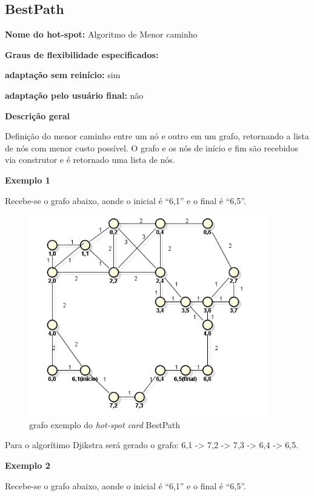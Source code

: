 \begin{anexosenv}
\section{BestPath}

{\large \textbf{Nome do hot-spot:}} Algoritmo de Menor caminho

{\large \textbf{Graus de flexibilidade especificados:}}

\textbf{adaptação sem reinício:} sim

\textbf{adaptação pelo usuário final:} não

{\large \textbf{Descrição geral}}

Definição do menor caminho entre um nó e outro em um grafo, retornando a lista de nós com menor custo possível. O grafo e os nós de início e fim são recebidos via construtor e é retornado uma lista de nós.

{\large \textbf{Exemplo 1}}

Recebe-se o grafo abaixo, aonde o inicial é “6,1” e o final é “6,5”.

\begin{figure}[H]
	\centering
	\label{figXX}
		\includegraphics[keepaspectratio=true,scale=0.7]{figuras/grafohotspotcard1.PNG}
	\caption{grafo exemplo do \textit{hot-spot card} BestPath}
\end{figure}

Para o algorítimo Djikstra será gerado o grafo: 6,1 -> 7,2 -> 7,3 -> 6,4 -> 6,5.

{\large \textbf{Exemplo 2}}

Recebe-se o grafo abaixo, aonde o inicial é “6,1” e o final é “6,5”.


\end{anexosenv}
